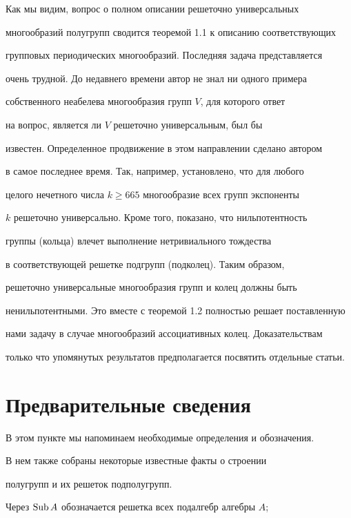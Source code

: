 Как мы видим, вопрос о полном описании решеточно универсальных


многообразий полугрупп сводится теоремой 1.1 к описанию соответствующих


групповых периодических многообразий. Последняя задача представляется


очень трудной. До недавнего времени автор не знал ни одного примера


собственного неабелева многообразия групп $V$, для которого ответ


на вопрос, является ли $V$ решеточно универсальным, был бы


известен. Определенное продвижение в этом направлении сделано автором


в самое последнее время. Так, например, установлено, что для любого


целого нечетного числа $k \ge 665$ многообразие всех групп экспоненты


$k$ решеточно универсально. Кроме того, показано, что нильпотентность


группы (кольца) влечет выполнение нетривиального тождества


в соответствующей решетке подгрупп (подколец). Таким образом,


решеточно универсальные многообразия групп и колец должны быть


ненильпотентными. Это вместе с теоремой 1.2 полностью решает поставленную


нами задачу в случае многообразий ассоциативных колец. Доказательствам


только что упомянутых результатов предполагается посвятить отдельные статьи.





\section{Предварительные сведения}





В этом пункте мы напоминаем необходимые определения и обозначения.


В нем также собраны некоторые известные факты о строении


полугрупп и их решеток подполугрупп.





Через $\operatorname{Sub} A$ обозначается решетка всех подалгебр алгебры $A$;


